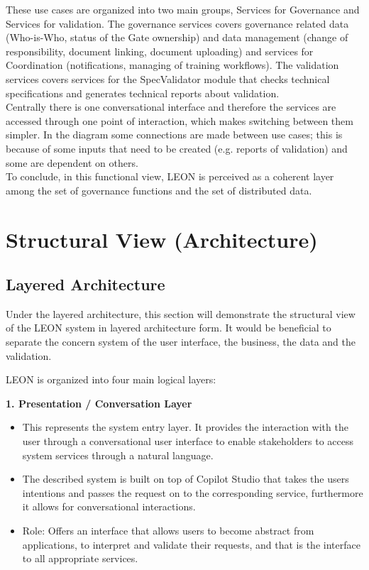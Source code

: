 These use cases are organized into two main groups, Services for Governance and Services for validation. The governance services covers governance related data (Who-is-Who, status of the Gate ownership) and data management (change of responsibility, document linking, document uploading) and services for Coordination (notifications, managing of training workflows). The validation services covers services for the SpecValidator module that checks technical specifications and generates technical reports about validation.\\
\vspace{0.5cm}
Centrally there is one conversational interface and therefore the services are accessed through one point of interaction, which makes switching between them simpler. In the diagram some connections are made between use cases; this is because of some inputs that need to be created (e.g. reports of validation) and some are dependent on others.\\
\vspace{0.5cm}
To conclude, in this functional view, LEON is perceived as a coherent layer among the set of governance functions and the set of distributed data.
\section{\textcolor[HTML]{0066CC}{Structural View (Architecture)}}
\label{sec:design-structural-view}

\subsection{Layered Architecture}

Under the layered architecture, this section will demonstrate the structural view of the LEON system in layered architecture form. It would be beneficial to separate the concern system of the user interface, the business, the data and the validation.

\vspace{0.2cm}
LEON is organized into four main logical layers:

\noindent\textcolor[HTML]{0066CC}{\textbf{1. Presentation / Conversation Layer}}
\begin{itemize}
    \item This represents the system entry layer. It provides the interaction with the user through a conversational user interface to enable stakeholders to access system services through a natural language.
    \item The described system is built on top of Copilot Studio that takes the users intentions and passes the request on to the corresponding service, furthermore it allows for conversational interactions.
    \item Role: Offers an interface that allows users to become abstract from applications, to interpret and validate their requests, and that is the interface to all appropriate services.
\end{itemize}


